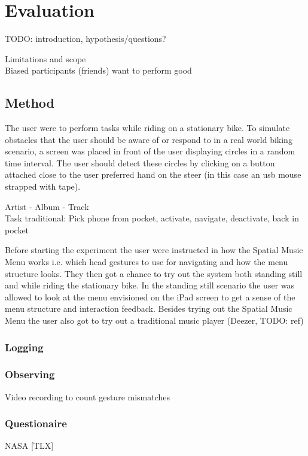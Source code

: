 \chapter{Evaluation}
TODO: introduction, hypothesis/questions?

Limitations and scope\\
Biased participants (friends) want to perform good

\section{Method}
The user were to perform tasks while riding on a stationary bike. To simulate obstacles that the user should be aware of or respond to in a real world biking scenario, a screen was placed in front of the user displaying circles in a random time interval. The user should detect these circles by clicking on a button attached close to the user preferred hand on the steer (in this case an usb mouse strapped with tape).

Artist - Album - Track\\
Task traditional: Pick phone from pocket, activate, navigate, deactivate, back in pocket

Before starting the experiment the user were instructed in how the Spatial Music Menu works i.e. which head gestures to use for navigating and how the menu structure looks. They then got a chance to try out the system both standing still and while riding the stationary bike. In the standing still scenario the user was allowed to look at the menu envisioned on the iPad screen to get a sense of the menu structure and interaction feedback. Besides trying out the Spatial Music Menu the user also got to try out a traditional music player (Deezer, TODO: ref)

\subsection{Logging}

\subsection{Observing}
Video recording to count gesture mismatches

\subsection{Questionaire}
NASA [TLX]



